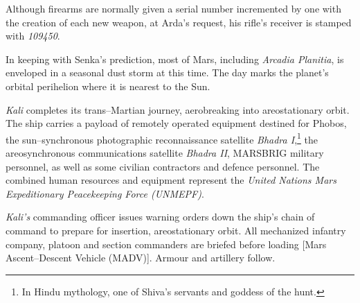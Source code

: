 Although firearms are normally given a serial number incremented by one with the creation of each new weapon, at Arda's request, his rifle's receiver is stamped with {\it 109450}.
\StopTimelineDate

In keeping with Senka's prediction, most of Mars, including {\it Arcadia Planitia}, is enveloped in a seasonal dust storm at this time. The day marks the planet's orbital perihelion where it is nearest to the Sun.
\StopTimelineDate

{\it Kali} completes its trans--Martian journey, aerobreaking into areostationary orbit. The ship carries a payload of remotely operated equipment destined for Phobos, the sun--synchronous photographic reconnaissance satellite {\it Bhadra I},\footnote{In Hindu mythology, one of Shiva's servants and goddess of the hunt.} the areosynchronous communications satellite {\it Bhadra II}, MARSBRIG military personnel, as well as some civilian contractors and defence personnel. The combined human resources and equipment represent the {\it United Nations Mars Expeditionary Peacekeeping Force (UNMEPF)}.
\StopTimelineDate

{\it Kali's} commanding officer issues warning orders down the ship's chain of command to prepare for insertion, areostationary orbit. All mechanized infantry company, platoon and section commanders are briefed before loading [Mars Ascent--Descent Vehicle (MADV)]. Armour and artillery follow.
\StopTimelineDate

